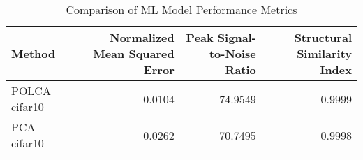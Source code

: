 \begin{table}[htbp]
\caption{Comparison of ML Model Performance Metrics}
\label{tab:model_comparison}
\begin{tabular}{lrrr}
\toprule
Method & Normalized Mean Squared Error & Peak Signal-to-Noise Ratio & Structural Similarity Index \\
\midrule
POLCA cifar10 & 0.0104 & 74.9549 & 0.9999 \\
PCA cifar10 & 0.0262 & 70.7495 & 0.9998 \\
\bottomrule
\end{tabular}
\end{table}
